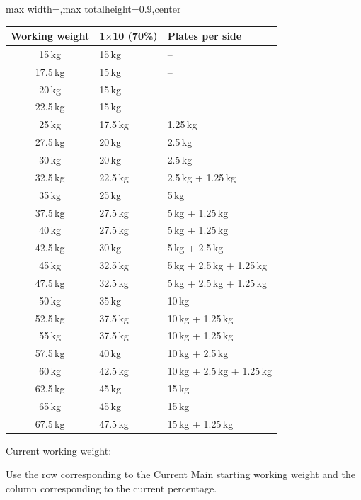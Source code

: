 \documentclass[11pt,a4paper]{article}
\newcommand{\tablearraystretch}{1.15}
\begin{document}
\begin{center}
\renewcommand{\arraystretch}{\tablearraystretch}
\begin{adjustbox}{max width=\linewidth,max totalheight=0.9\textheight,center}
\begin{tabular}{cll}
\toprule
Working weight & 1$\times$10 (70\%) & Plates per side \\
\midrule
15\,kg   & 15\,kg   & -- \\
17.5\,kg & 15\,kg   & -- \\
20\,kg   & 15\,kg   & -- \\
22.5\,kg & 15\,kg   & -- \\
25\,kg   & 17.5\,kg & 1.25\,kg \\
27.5\,kg & 20\,kg   & 2.5\,kg \\
30\,kg   & 20\,kg   & 2.5\,kg \\
32.5\,kg & 22.5\,kg & 2.5\,kg + 1.25\,kg \\
35\,kg   & 25\,kg   & 5\,kg \\
37.5\,kg & 27.5\,kg & 5\,kg + 1.25\,kg \\
40\,kg   & 27.5\,kg & 5\,kg + 1.25\,kg \\
42.5\,kg & 30\,kg   & 5\,kg + 2.5\,kg \\
45\,kg   & 32.5\,kg & 5\,kg + 2.5\,kg + 1.25\,kg \\
47.5\,kg & 32.5\,kg & 5\,kg + 2.5\,kg + 1.25\,kg \\
50\,kg   & 35\,kg   & 10\,kg \\
52.5\,kg & 37.5\,kg & 10\,kg + 1.25\,kg \\
55\,kg   & 37.5\,kg & 10\,kg + 1.25\,kg \\
57.5\,kg & 40\,kg   & 10\,kg + 2.5\,kg \\
60\,kg   & 42.5\,kg & 10\,kg + 2.5\,kg + 1.25\,kg \\
62.5\,kg & 45\,kg   & 15\,kg \\
65\,kg   & 45\,kg   & 15\,kg \\
67.5\,kg & 47.5\,kg & 15\,kg + 1.25\,kg \\
\bottomrule
\end{tabular}
\end{adjustbox}
\renewcommand{\arraystretch}{1}
\end{center}

Current working weight:

Use the row corresponding to the Current Main starting working weight and the column corresponding to the current percentage.
\end{document}
